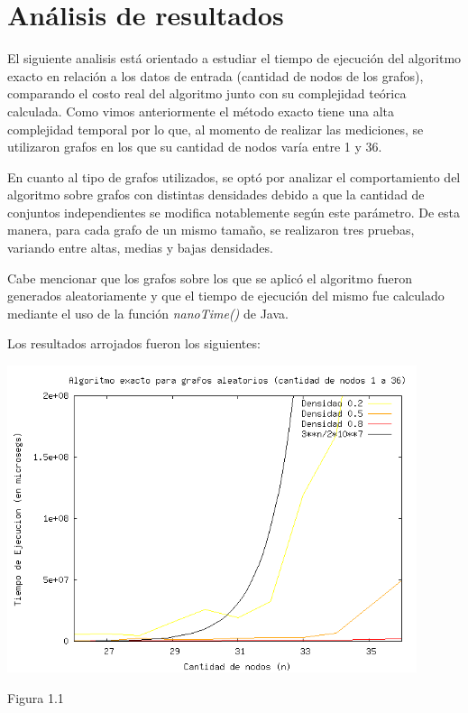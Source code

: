 \documentclass[a4paper,11pt] {article}
\begin{document}
\section*{An\'alisis de resultados}

El siguiente analisis est\'a orientado a estudiar el tiempo de ejecuci\'on del algoritmo exacto en relaci\'on a los datos de entrada (cantidad de nodos de los grafos), comparando el costo real del algoritmo junto con su complejidad te\'orica calculada. Como vimos anteriormente el m\'etodo exacto tiene una alta complejidad temporal por lo que, al momento de realizar las mediciones, se utilizaron grafos en los que su cantidad de nodos var\'ia entre 1 y 36.

En cuanto al tipo de grafos utilizados, se opt\'o por analizar el comportamiento del algoritmo sobre grafos con distintas densidades debido a que la cantidad de conjuntos independientes se modifica notablemente seg\'un este par\'ametro. De esta manera, para cada grafo de un mismo tama\~{n}o, se realizaron tres pruebas, variando entre altas, medias y bajas densidades.

Cabe mencionar que los grafos sobre los que se aplic\'o el algoritmo fueron generados aleatoriamente y que el tiempo de ejecuci\'on del mismo fue calculado mediante el uso de la funci\'on \textit{nanoTime()} de Java.

Los resultados arrojados fueron los siguientes:

\begin{center}
 \includegraphics[width=0.9\textwidth]{graficos/tiemposExacto.png}
\begin{center}
Figura 1.1
\end{center}
\end{center}
\end{document}
